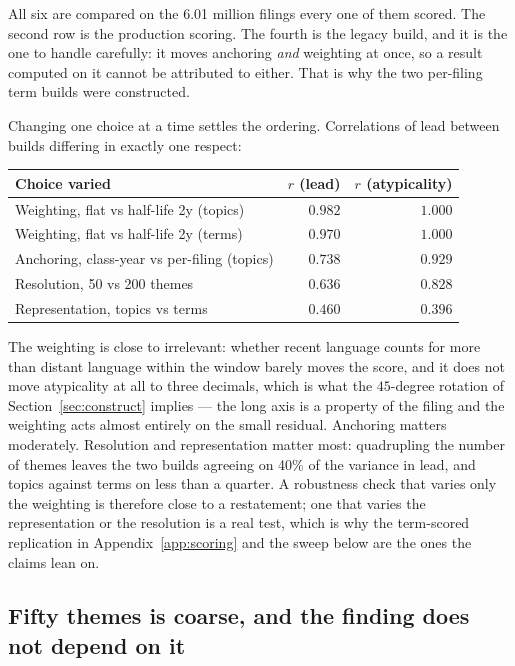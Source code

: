 \noindent All six are compared on the 6.01 million filings every one of them
scored. The second row is the production scoring. The fourth is the legacy
build, and it is the one to handle carefully: it moves anchoring \emph{and}
weighting at once, so a result computed on it cannot be attributed to either.
That is why the two per-filing term builds were constructed.

Changing one choice at a time settles the ordering. Correlations of lead
between builds differing in exactly one respect:

\begin{center}\small
\begin{tabular}{lrr}
\toprule
Choice varied & $r$ (lead) & $r$ (atypicality) \\
\midrule
Weighting, flat vs half-life 2y (topics)  & $0.982$ & $1.000$ \\
Weighting, flat vs half-life 2y (terms)   & $0.970$ & $1.000$ \\
Anchoring, class-year vs per-filing (topics) & $0.738$ & $0.929$ \\
Resolution, 50 vs 200 themes              & $0.636$ & $0.828$ \\
Representation, topics vs terms           & $0.460$ & $0.396$ \\
\bottomrule
\end{tabular}
\end{center}

\noindent The weighting is close to irrelevant: whether recent language counts
for more than distant language within the window barely moves the score, and it
does not move atypicality at all to three decimals, which is what the
$45$-degree rotation of Section~\ref{sec:construct} implies --- the long axis is
a property of the filing and the weighting acts almost entirely on the small
residual. Anchoring matters moderately. Resolution and representation matter
most: quadrupling the number of themes leaves the two builds agreeing on 40\%
of the variance in lead, and topics against terms on less than a quarter. A
robustness check that varies only the weighting is therefore close to a
restatement; one that varies the representation or the resolution is a real
test, which is why the term-scored replication in Appendix~\ref{app:scoring}
and the sweep below are the ones the claims lean on.

\subsection{Fifty themes is coarse, and the finding does not depend on it}

